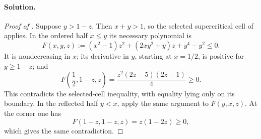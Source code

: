 \paragraph{Solution.}

\begin{proof}[Proof of ]
Suppose $y>1-z$.  Then $x+y>1$, so the selected supercritical cell of
 applies.  In the ordered half $x\le y$
its necessary polynomial is
\[
 F(x,y,z):=(x^2-1)z^2+(2xy^2+y)z+y^4-y^2\le0.
\]
It is nondecreasing in $x$; its derivative in $y$, starting at $x=1/2$, is
positive for $y\ge1-z$; and
\[
 F\!\left(\frac12,1-z,z\right)
 =\frac{z^2(2z-5)(2z-1)}4\ge0.
\]
This contradicts the selected-cell inequality, with equality lying only on
its boundary.  In the reflected half $y<x$, apply the same argument to
$F(y,x,z)$.  At the corner one has
\[
 F(1-z,1-z,z)=z(1-2z)\ge0,
\]
which gives the same contradiction.
\end{proof}

